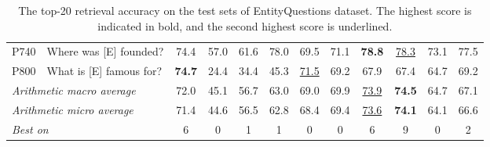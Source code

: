 \documentclass[letterpaper]{article} \usepackage{aaai23}  \usepackage{times}  \usepackage{helvet}  \usepackage{courier}  \usepackage[hyphens]{url}  \usepackage{graphicx} \urlstyle{rm} \def\UrlFont{\rm}  \usepackage{natbib}  \usepackage{caption} \frenchspacing  \setlength{\pdfpagewidth}{8.5in}  \setlength{\pdfpageheight}{11in}  \usepackage{algorithm}
\begin{document}
\begin{table*}
{\begin{tabular}{llcccccccccc}
			P740                                                  & Where was [E] founded?                  & 74.4             & 57.0            & 61.6               & 78.0             & 69.5                         & 71.1                        & \textbf{78.8}      & \underline{78.3}  & 73.1                & 77.5                     \\
			P800                                                  & What is [E] famous for?                 & \textbf{74.7}    & 24.4            & 34.4               & 45.3             & \underline{71.5}             & 69.2                        & 67.9               & 67.4              & 64.7                & 69.2                     \\

			\midrule
			\multicolumn{2}{l}{\textit{Arithmetic macro average}} & 72.0                                    & 45.1             & 56.7            & 63.0               & 69.0             & 69.9                         & \underline{73.9}            & \textbf{74.5}      & 64.7              & 67.1                                           \\
			\multicolumn{2}{l}{\textit{Arithmetic micro average}} & 71.4                                    & 44.6             & 56.5            & 62.8               & 68.4             & 69.4                         & \underline{73.6}            & \textbf{74.1}      & 64.1              & 66.6                                           \\
			\multicolumn{2}{l}{\textit{Best on}}                  & 6                                       & 0                & 1               & 1                  & 0                & 0                            & 6                           & 9                  & 0                 & 2                                              \\
			\bottomrule
		\end{tabular}
	}
	\caption{
		The top-20 retrieval accuracy on the test sets of EntityQuestions dataset. The highest score is indicated in bold, and the second highest score is underlined.
	}
	\label{tab:resutls_eq}
\end{table*}
\end{document}
